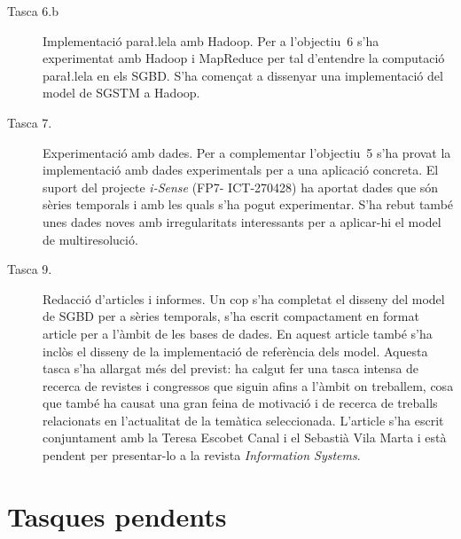 \begin{description}
\item[Tasca 6.b] Implementació para\l.lela amb Hadoop. Per a
  l'objectiu~6 s'ha experimentat amb Hadoop i MapReduce per
  tal d'entendre la computació para\l.lela en els SGBD. S'ha començat
  a dissenyar una implementació del model de SGSTM a Hadoop.



\item[Tasca 7.] Experimentació amb dades. Per a complementar
  l'objectiu~5 s'ha provat la implementació amb dades experimentals
  per a una aplicació concreta. El suport del projecte \emph{i-Sense}
  (FP7- ICT-270428) ha aportat dades que són sèries temporals i amb
  les quals s'ha pogut experimentar.  S'ha rebut també unes dades
  noves amb irregularitats interessants per a aplicar-hi el model de
  multiresolució.







\item[Tasca 9.] Redacció d'articles i informes. Un cop s'ha completat
  el disseny del model de SGBD per a sèries temporals, s'ha escrit
  compactament en format article per a l'àmbit de les bases de dades.
  En aquest article també s'ha inclòs el disseny de la implementació
  de referència dels model.  Aquesta tasca s'ha allargat més del
  previst: ha calgut fer una tasca intensa de recerca de revistes i
  congressos que siguin afins a l'àmbit on treballem, cosa que també
  ha causat una gran feina de motivació i de recerca de treballs
  relacionats en l'actualitat de la temàtica seleccionada.  L'article
  s'ha escrit conjuntament amb la Teresa Escobet Canal i el Sebastià
  Vila Marta i està pendent per presentar-lo a la revista
  \emph{Information Systems}.
\end{description}






\section{Tasques pendents}


